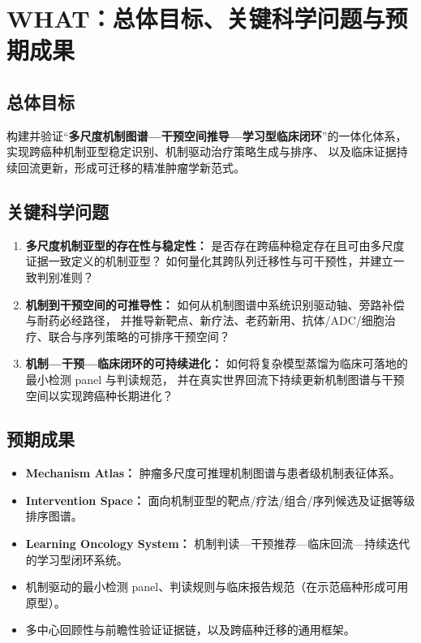 \documentclass[12pt,a4paper,fontset=mac]{ctexart}
\begin{document}
\section{WHAT：总体目标、关键科学问题与预期成果}

\subsection{总体目标}
构建并验证“\textbf{多尺度机制图谱—干预空间推导—学习型临床闭环}”的一体化体系，
实现跨癌种机制亚型稳定识别、机制驱动治疗策略生成与排序、
以及临床证据持续回流更新，形成可迁移的精准肿瘤学新范式。

\subsection{关键科学问题}
\begin{enumerate}[leftmargin=2em]
  \item \textbf{多尺度机制亚型的存在性与稳定性：}
        是否存在跨癌种稳定存在且可由多尺度证据一致定义的机制亚型？
        如何量化其跨队列迁移性与可干预性，并建立一致判别准则？
  \item \textbf{机制到干预空间的可推导性：}
        如何从机制图谱中系统识别驱动轴、旁路补偿与耐药必经路径，
        并推导新靶点、新疗法、老药新用、抗体/ADC/细胞治疗、联合与序列策略的可排序干预空间？
  \item \textbf{机制—干预—临床闭环的可持续进化：}
        如何将复杂模型蒸馏为临床可落地的最小检测 panel 与判读规范，
        并在真实世界回流下持续更新机制图谱与干预空间以实现跨癌种长期进化？
\end{enumerate}

\subsection{预期成果}
\begin{itemize}[leftmargin=2em]
  \item \textbf{Mechanism Atlas：} 肿瘤多尺度可推理机制图谱与患者级机制表征体系。
  \item \textbf{Intervention Space：} 面向机制亚型的靶点/疗法/组合/序列候选及证据等级排序图谱。
  \item \textbf{Learning Oncology System：} 机制判读—干预推荐—临床回流—持续迭代的学习型闭环系统。
  \item 机制驱动的最小检测 panel、判读规则与临床报告规范（在示范癌种形成可用原型）。
  \item 多中心回顾性与前瞻性验证证据链，以及跨癌种迁移的通用框架。
\end{itemize}
\end{document}
